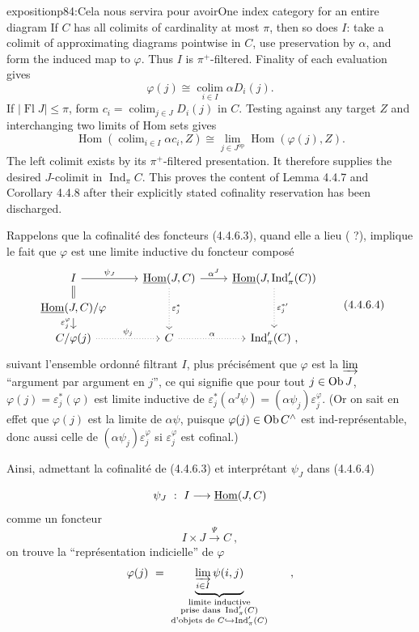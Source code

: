\begin{dcomment}{exposition}{p84:Cela nous servira pour avoir}{One index category for an entire diagram}
If $C$ has all colimits of cardinality at most $\pi$, then so does $I$: take a colimit of approximating diagrams pointwise in $C$, use preservation by $\alpha$, and form the induced map to $\varphi$.  Thus $I$ is $\pi^+$-filtered.  Finality of each evaluation gives
\[
 \varphi(j)\cong\operatorname*{colim}_{i\in I}\alpha D_i(j).
\]
If $|\operatorname{Fl}J|\leq\pi$, form $c_i=\operatorname{colim}_{j\in J}D_i(j)$ in $C$.  Testing against any target $Z$ and interchanging two limits of Hom sets gives
\[
 \operatorname{Hom}(\operatorname{colim}_{i\in I}\alpha c_i,Z)
 \cong\operatorname{lim}_{j\in J^{\mathrm{op}}}\operatorname{Hom}(\varphi(j),Z).
\]
The left colimit exists by its $\pi^+$-filtered presentation.  It therefore supplies the desired $J$-colimit in $\operatorname{Ind}_\pi C$.  This proves the content of Lemma 4.4.7 and Corollary 4.4.8 after their explicitly stated cofinality reservation has been discharged.
\end{dcomment}


Rappelons que la cofinalité des foncteurs (4.4.6.3), quand elle a lieu ( ?), implique le fait que $\varphi$ est une limite inductive du foncteur composé
\[
\begin{tikzcd}[row sep=small]
I \arrow[r, "\psi_J"] \arrow[d, equal] & \uHom(J,C) \arrow[r, "\alpha^J"] \arrow[dd, dotted, "\varepsilon_j^*"] & \uHom(J,\Ind'_\pi(C)) \arrow[dd, dotted, "{\varepsilon_j^{*\prime}}"] \\
\uHom(J,C)/\varphi \arrow[d, "\varepsilon_j^\varphi"'] & & \\
C/\varphi(j) \arrow[r, dotted, "\psi_j"] & C \arrow[r, dotted, "\alpha"] & \Ind'_\pi(C)\ ,
\end{tikzcd}
\tag*{(4.4.6.4)}
\]
suivant l'ensemble ordonné filtrant $I$, plus précisément que $\varphi$ est la $\varinjlim$ “argument par argument en $j$”, ce qui signifie que pour tout $j \in \mathrm{Ob}\, J$, $\varphi(j) = \varepsilon_j^*(\varphi)$ est limite inductive de $\varepsilon_j^*(\alpha^J\psi) = (\alpha\psi_j)\varepsilon_j^\varphi$. (Or on sait en effet que $\varphi(j)$ est la limite de $\alpha\psi$, puisque $\varphi(j) \in \mathrm{Ob}\, C^\wedge$ est ind-représentable, donc aussi celle de $(\alpha\psi_j)\varepsilon_j^\varphi$ si $\varepsilon_j^\varphi$ est cofinal.)

Ainsi, admettant la cofinalité de (4.4.6.3) et interprétant $\psi_J$ dans (4.4.6.4)

\[
\psi_J \ :\ I \longrightarrow \underline{\mathrm{Hom}}(J,C)
\]
comme un foncteur
\[
I \times J \xrightarrow{\Psi} C\ , %
\]
on trouve la “représentation indicielle” de $\varphi$
\[
\varphi(j) \ =\ \underbrace{\varinjlim_{i\in I} \psi(i,j)}_{\substack{\text{limite inductive}\\ \text{prise dans } \Ind'_\pi(C)\\ \text{d'objets de } C \hookrightarrow \Ind'_\pi(C)}} \qquad ,
\]

